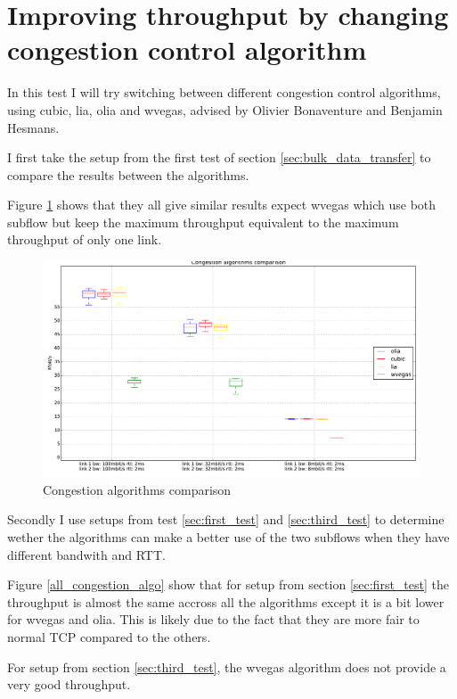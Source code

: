 \section{Improving throughput by changing congestion control algorithm} \label{sec:improving_throughput_congestion_control}

In this test I will try switching between different congestion control algorithms, using cubic, lia, olia and wvegas, advised by Olivier Bonaventure and Benjamin Hesmans.

I first take the setup from the first test of section \ref{sec:bulk_data_transfer} to compare the results between the algorithms.

Figure \ref{all_congestion_algo_2rtt} shows that they all give similar results expect wvegas which use both subflow but keep the maximum throughput equivalent to the maximum throughput of only one link.

\begin{figure}[h!]
  \centering
  \includegraphics[width=1\textwidth]{../results/all_congestion_algo_2rrt.pdf}
  \caption{Congestion algorithms comparison}
  \label{all_congestion_algo_2rtt}
\end{figure}


Secondly I use setups from test \ref{sec:first_test} and \ref{sec:third_test} to determine wether the algorithms can make a better use of the two subflows when they have different bandwith and RTT.

Figure \ref{all_congestion_algo} show that for setup from section \ref{sec:first_test} the throughput is
almost the same accross all the algorithms except it is a bit lower for wvegas and olia. This is likely due to the fact that they are more fair to normal TCP compared to the others.

For setup from section \ref{sec:third_test}, the wvegas algorithm does not provide a very good throughput.

